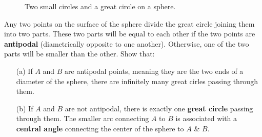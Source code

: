 \begin{tcolorbox}[title={Great Circular Arcs on a Sphere}]
\begin{question}
\begin{figure}[H]
    \caption{Two small circles and a great circle on a sphere.}
    \label{fig:small-great}
\end{figure}


Any two points on the surface of the sphere divide the great circle joining them into two parts. These two parts will be equal to each other if the two points are \textbf{antipodal} (diametrically opposite to one another). Otherwise, one of the two parts will be smaller than the other. Show that:
\begin{enumerate}
    \item[(a)] If $A$ and $B$ are antipodal points, meaning they are the two ends of a diameter of the sphere, there are infinitely many great cirles passing through them.
    \item[(b)] If $A$ and $B$ are not antipodal, there is exactly one \textbf{great circle} passing through them. The smaller arc connecting $A$ to $B$ is associated with a \textbf{central angle} connecting the center of the sphere to $A$ \& $B$. 
\end{enumerate}
\end{question}
\end{tcolorbox}


